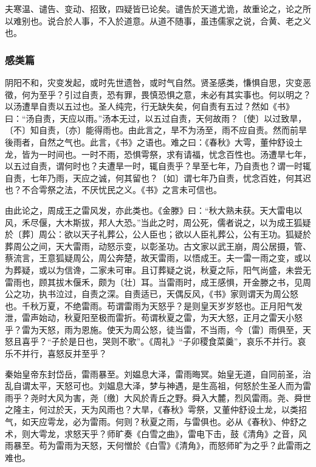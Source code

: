 \documentclass[]{article}
\begin{document}
夫寒温、谴告、变动、招致，四疑皆已论矣。谴告於天道尤诡，故重论之，论之所以难别也。说合於人事，不入於道意。从道不随事，虽违儒家之说，合黄、老之义也。

\hypertarget{header-n766}{%
\subsubsection{感类篇}\label{header-n766}}

阴阳不和，灾变发起，或时先世遗咎，或时气自然。贤圣感类，慊惧自思，灾变恶徵，何为至乎？引过自责，恐有罪，畏慎恐惧之意，未必有其实事也。何以明之？以汤遭旱自责以五过也。圣人纯完，行无缺失矣，何自责有五过？然如《书》曰：``汤自责，天应以雨。''汤本无过，以五过自责，天何故雨？〔使〕以过致旱，〔不〕知自责，〔亦〕能得雨也。由此言之，旱不为汤至，雨不应自责。然而前旱後雨者，自然之气也。此言，《书》之语也。难之曰：《春秋》大雩，董仲舒设土龙，皆为一时间也。一时不雨，恐惧雩祭，求有请福，忧念百性也。汤遭旱七年，以五过自责，谓何时也？夫遭旱一时，辄自责乎？旱至七年，乃自责也？谓一时辄自责，七年乃雨，天应之诚，何其留也？〔如〕谓七年乃自责，忧念百姓，何其迟也？不合雩祭之法，不厌忧民之义。《书》之言未可信也。

由此论之，周成王之雷风发，亦此类也。《金滕》曰：``秋大熟未获。天大雷电以风，禾尽偃，大木斯拔，邦人大恐。''当此之时，周公死，儒者说之，以为成王狐疑於〔葬〕周公：欲以天子礼葬公，公人臣也；欲以人臣礼葬公，公有王功。狐疑於葬周公之间，天大雷雨，动怒示变，以彰圣功。古文家以武王崩，周公居摄，管、蔡流言，王意狐疑周公，周公奔楚，故天雷雨，以悟成王。夫一雷一雨之变，或以为葬疑，或以为信谗，二家未可审。且订葬疑之说，秋夏之际，阳气尚盛，未尝无雷雨也，顾其拔木偃禾，颇为〔壮〕耳。当雷雨时，成王感惧，开金滕之书，见周公之功，执书泣过，自责之深。自责适已，天偶反风，《书》家则谓天为周公怒也。千秋万夏，不绝雷雨。苟谓雷雨为天怒乎？是则皇天岁岁怒也。正月阳气发泄，雷声始动，秋夏阳至极而雷折。苟谓秋夏之雷，为天大怒，正月之雷天小怒乎？雷为天怒，雨为恩施。使天为周公怒，徒当雷，不当雨，今〔雷〕雨俱至，天怒且喜乎？``子於是日也，哭则不歌''。《周礼》``子卯稷食菜羹''，哀乐不并行。哀乐不并行，喜怒反并至乎？

秦始皇帝东封岱岳，雷雨暴至。刘媪息大泽，雷雨晦冥。始皇无道，自同前圣，治乱自谓太平，天怒可也。刘媪息大泽，梦与神遇，是生高祖，何怒於生圣人而为雷雨乎？尧时大风为害，尧〔缴〕大风於青丘之野。舜入大麓，烈风雷雨。尧、舜世之隆主，何过於天，天为风雨也？大旱，《春秋》雩祭，又董仲舒设土龙，以类招气，如天应雩龙，必为雷雨。何则？秋夏之雨，与雷俱也。必从《春秋》、仲舒之术，则大雩龙，求怒天乎？师旷奏《白雪之曲》，雷电下击，鼓《清角》之音，风雨暴至。苟为雷雨为天怒，天何憎於《白雪》《清角》，而怒师旷为之乎？此雷雨之难也。
\end{document}
